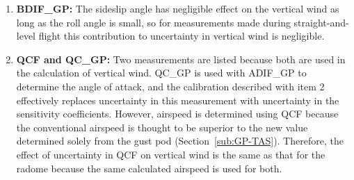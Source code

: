 \documentclass[12pt,twoside,english]{article}\usepackage[]{graphicx}\usepackage[]{color}
\let\OrgIndex\index
\renewcommand*{\index}[1]{\OrgIndex{#1}}
\begin{document}
\begin{enumerate}
\item \textbf{BDIF\_GP:} The sideslip angle has negligible effect on the vertical wind as long as the roll angle is small, so for measurements made during straight-and-level flight this contribution to uncertainty in vertical wind is negligible.  
\item \textbf{QCF and QC\_GP:} Two measurements are listed because both are used in the calculation of vertical wind. QC\_GP is used with ADIF\_GP to determine the angle of attack, and the calibration described with item 2 effectively replaces uncertainty in this measurement with uncertainty in the sensitivity coefficients. However, airspeed is determined using QCF because the conventional airspeed is thought to be superior to the new value determined solely from the gust pod (Section~\ref{sub:GP-TAS}). Therefore, the effect of uncertainty in QCF on vertical wind is the same as that for the radome because the same calculated airspeed is used for both.  

\end{enumerate}
\end{document}

